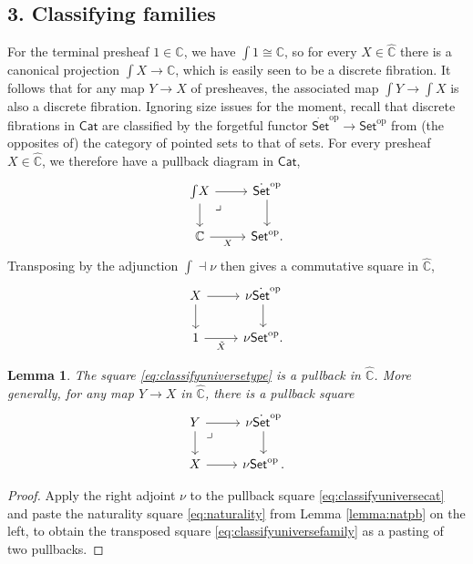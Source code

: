\documentclass[11pt]{article}
\newcommand{\C}{\ensuremath{\mathbb{C}}}
\newcommand{\op}[1]{\ensuremath{{#1}^{\mathrm{op}}}}
\newcommand{\Set}{\ensuremath{\mathsf{Set}}}
\newcommand{\Cat}{\ensuremath{\mathsf{Cat}}}
\newcommand{\ra}{\ensuremath{\rightarrow}}
\renewcommand{\to}{\ensuremath{\rightarrow}}
\newcommand{\elem}[1]{\textstyle\int\!{#1}}
\newcommand{\pbmark}{\ar[dr, phantom, "\lrcorner" very near start, shift right=.5ex]}	%
\newtheorem{lemma}[theorem]{Lemma}
\theoremstyle{remark}
\theoremstyle{definition}
\begin{document}
\subsection*{3. Classifying families}

For the terminal presheaf $1\in\widehat{\C}$, we have $\elem{1} \cong\C$, so for every $X\in\widehat{\C}$ there is a canonical projection  $\elem X \ra\C$, which is easily seen to be a discrete fibration.  It follows that for any map $Y\to X$ of presheaves, the associated map $\elem Y \to \elem X$ is also a discrete fibration. 
Ignoring size issues for the moment, recall that discrete fibrations in $\Cat$ are classified by the forgetful functor $\op{\dot{\Set}}\to \op{\Set}$ from (the opposites of) the category of pointed sets to that of sets.  For every presheaf $X\in\widehat{\C}$, we therefore have a pullback diagram in $\Cat$,
\begin{equation}\label{eq:classifyuniversecat}\textstyle
\begin{tikzcd}
	 \elem X \ar[d] \ar[r] \pbmark & \op{\dot{\Set}} \ar[d]\\  
	\C \ar[r,swap,"X"] &  \op{\Set}.
 \end{tikzcd}
 \end{equation}
 Transposing by the adjunction $\int\dashv \nu$ then gives a commutative square in $\widehat{\C}$,
\begin{equation}\label{eq:classifyuniversetype}\textstyle
\begin{tikzcd}
	 X \ar[d] \ar[r] & \nu\op{\dot{\Set}} \ar[d]\\  
	1 \ar[r,swap,"\tilde{X}"] &  \nu\op{\Set}.
 \end{tikzcd}
 \end{equation}

\begin{lemma}
The square \eqref{eq:classifyuniversetype} is a pullback in $\widehat{\C}$. More generally, for any map $Y\ra X$ in $\widehat{\C}$, there is a pullback square 
\begin{equation}\label{eq:classifyuniversefamily}\textstyle
\begin{tikzcd}
	 Y \ar[d] \pbmark \ar[r] & \nu\op{\dot{\Set}} \ar[d] \\  
	X \ar[r] &  \nu\op{\Set}\,.
 \end{tikzcd}
 \end{equation}
\end{lemma}

\begin{proof}
Apply the right adjoint $\nu$ to the pullback square \eqref{eq:classifyuniversecat} and paste the naturality square \eqref{eq:naturality} from Lemma \ref{lemma:natpb} on the left, to obtain the transposed square \eqref{eq:classifyuniversefamily} as a pasting of two pullbacks.
\end{proof}
\end{document}
